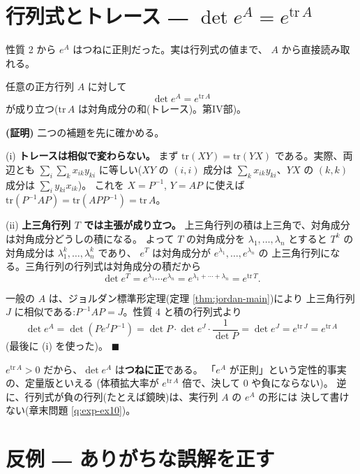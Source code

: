 \section{行列式とトレース ― $\det e^{A} = e^{\mathrm{tr}\,A}$}

性質 2 から $e^{A}$ はつねに正則だった。実は行列式の値まで、
$A$ から直接読み取れる。

\begin{teiri}[指数関数の行列式]\label{thm:exp-det}
任意の正方行列 $A$ に対して
\[
\det e^{A} = e^{\mathrm{tr}\,A}
\]
が成り立つ($\mathrm{tr}\,A$ は対角成分の和(トレース)。第IV部)。
\end{teiri}

\noindent\textbf{(証明)}\quad
二つの補題を先に確かめる。

(i) \textbf{トレースは相似で変わらない。}
まず $\mathrm{tr}(XY) = \mathrm{tr}(YX)$ である。実際、両辺とも
$\sum_i \sum_k x_{ik}y_{ki}$ に等しい($XY$ の $(i,i)$ 成分は
$\sum_k x_{ik}y_{ki}$、$YX$ の $(k,k)$ 成分は $\sum_i y_{ki}x_{ik}$)。
これを $X = P^{-1}$, $Y = AP$ に使えば
$\mathrm{tr}(P^{-1}AP) = \mathrm{tr}(APP^{-1}) = \mathrm{tr}\,A$。

(ii) \textbf{上三角行列 $T$ では主張が成り立つ。}
上三角行列の積は上三角で、対角成分は対角成分どうしの積になる。
よって $T$ の対角成分を $\lambda_1, \dots, \lambda_n$ とすると
$T^k$ の対角成分は $\lambda_1^k, \dots, \lambda_n^k$ であり、
$e^{T}$ は対角成分が $e^{\lambda_1}, \dots, e^{\lambda_n}$ の
上三角行列になる。三角行列の行列式は対角成分の積だから
\[
\det e^{T} = e^{\lambda_1} \cdots e^{\lambda_n}
= e^{\lambda_1 + \cdots + \lambda_n} = e^{\mathrm{tr}\,T}.
\]

一般の $A$ は、ジョルダン標準形定理(定理 \ref{thm:jordan-main})により
上三角行列 $J$ に相似である:$P^{-1}AP = J$。性質 4 と積の行列式より
\[
\det e^{A} = \det (P e^{J} P^{-1})
= \det P \cdot \det e^{J} \cdot \frac{1}{\det P} = \det e^{J}
= e^{\mathrm{tr}\,J} = e^{\mathrm{tr}\,A}
\]
(最後に (i) を使った)。 $\blacksquare$

\begin{chui}
$e^{\mathrm{tr}\,A} > 0$ だから、$\det e^{A}$ は\textbf{つねに正}である。
「$e^{A}$ が正則」という定性的事実の、定量版といえる
(体積拡大率が $e^{\mathrm{tr}\,A}$ 倍で、決して $0$ や負にならない)。
逆に、行列式が負の行列(たとえば鏡映)は、実行列 $A$ の $e^{A}$ の形には
決して書けない(章末問題 \ref{q:exp-ex10})。
\end{chui}

\section{反例 ― ありがちな誤解を正す}

